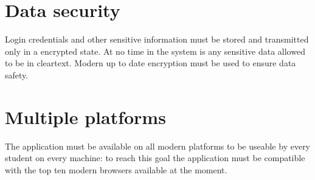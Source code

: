 \documentclass{scrreprt}
\begin{document}
	\section{Data security}
	Login credentials and other sensitive information must be stored and transmitted only in a encrypted state. At no time in the system is any sensitive data allowed to be in cleartext. Modern up to date encryption must be used to ensure data safety.
	
	\section{Multiple platforms}
	The application must be available on all modern platforms to be useable by every student on every machine: to reach this goal the application must be compatible with the top ten modern browsers available at the moment.
	
\end{document}
